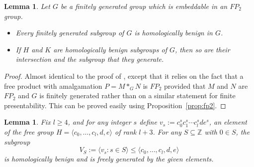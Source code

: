 \documentclass[12pt,a4paper]{article}
\newtheorem{lemma}[theorem]{Lemma}
\newcommand{\zz}{{\mathbb Z}}
\begin{document}
\begin{lemma}
Let $G$ be a finitely generated group which is embeddable in an $FP_2$
group.   
\begin{itemize} 
\item{} Every finitely generated subgroup of $G$ is homologically
  benign in $G$.   
\item{} If $H$ and $K$ are homologically benign subgroups of $G$, 
then so are their intersection and the subgroup that they generate.  
\end{itemize}
\end{lemma}

\begin{proof} 
Almost identical to the proof of \cite[Lemma~IV.7.7]{lynsch}, except 
that it relies on the fact that a free product with amalgamation 
$P=M*_GN$ is $FP_2$ provided that $M$ and $N$ are $FP_2$ and $G$ 
is finitely generated rather than on a similar statement for 
finite presentability.  This can be proved easily using 
Proposition~\ref{prop:fp2}. 
\end{proof} 

\begin{lemma} \label{lem:anys}
Fix $l\geq 4$, and for any integer $s$ define 
$v_s:= c_0^sc_1^s\cdots c_l^s d e^s$, an element of the free 
group $H=\langle c_0,\ldots,c_l, d, e\rangle$ of rank $l+3$.  
For any $S\subseteq \zz$ with $0\in S$, the subgroup 
$$V_S:=\langle v_s \colon s\in S\rangle 
\leq \langle c_0,\ldots,c_l, d, e\rangle$$ 
is homologically benign and is freely generated by the given
elements.  
\end{lemma} 
\end{document}
